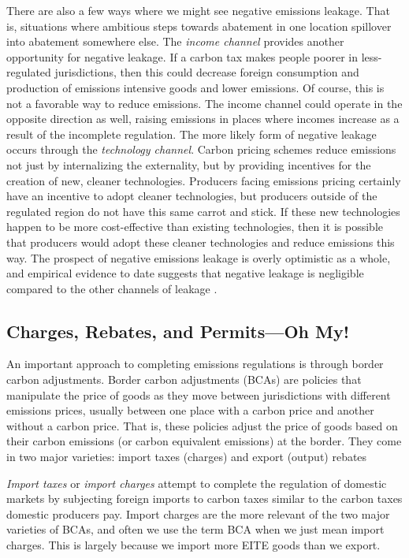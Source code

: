 There are also a few ways where we might see negative emissions leakage. That is, situations where ambitious steps towards abatement in one location spillover into abatement somewhere else. The \emph{income channel} provides another opportunity for negative leakage. If a carbon tax makes people poorer in less-regulated jurisdictions, then this could decrease foreign consumption and production of emissions intensive goods and lower emissions. Of course, this is not a favorable way to reduce emissions. The income channel could operate in the opposite direction as well, raising emissions in places where incomes increase as a result of the incomplete regulation. The more likely form of negative leakage occurs through the \emph{technology channel}. Carbon pricing schemes reduce emissions not just by internalizing the externality, but by providing incentives for the creation of new, cleaner technologies. Producers facing emissions pricing certainly have an incentive to adopt cleaner technologies, but producers outside of the regulated region do not have this same carrot and stick. If these new technologies happen to be more cost-effective than existing technologies, then it is possible that producers would adopt these cleaner technologies and reduce emissions this way. The prospect of negative emissions leakage is overly optimistic as a whole, and empirical evidence to date suggests that negative leakage is negligible compared to the other channels of leakage \citep{winchester2013numerical}.

\subsection{Charges, Rebates, and Permits---Oh My!}

An important approach to completing emissions regulations is through border carbon adjustments. Border carbon adjustments (BCAs) are policies that manipulate the price of goods as they move between jurisdictions with different emissions prices, usually between one place with a carbon price and another without a carbon price. That is, these policies adjust the price of goods based on their carbon emissions (or carbon equivalent emissions) at the border. They come in two major varieties: import taxes (charges) and export (output) rebates

\emph{Import taxes} or \emph{import charges} attempt to complete the regulation of domestic markets by subjecting foreign imports to carbon taxes similar to the carbon taxes domestic producers pay. Import charges are the more relevant of the two major varieties of BCAs, and often we use the term BCA when we just mean import charges. This is largely because we import more EITE goods than we export. 

